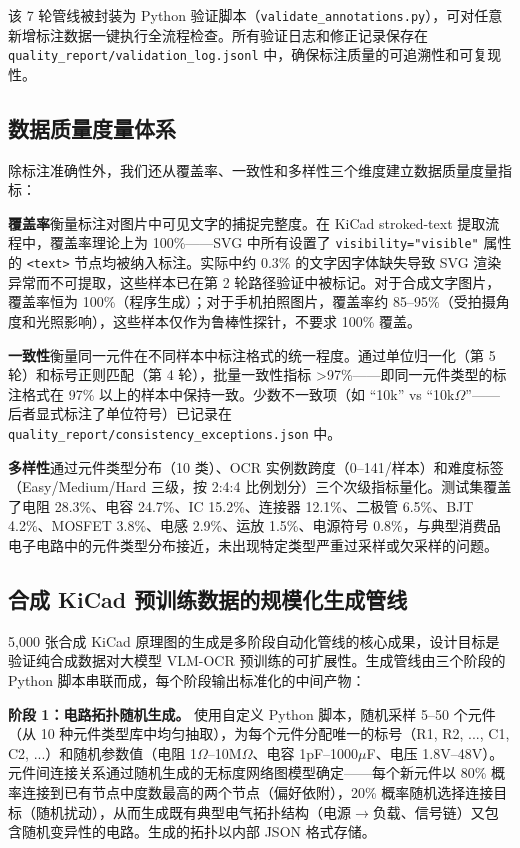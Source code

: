 该 7 轮管线被封装为 Python 验证脚本（\texttt{validate\_annotations.py}），可对任意新增标注数据一键执行全流程检查。所有验证日志和修正记录保存在 \texttt{quality\_report/validation\_log.jsonl} 中，确保标注质量的可追溯性和可复现性。

\subsection{数据质量度量体系}

除标注准确性外，我们还从覆盖率、一致性和多样性三个维度建立数据质量度量指标：

\textbf{覆盖率}衡量标注对图片中可见文字的捕捉完整度。在 KiCad stroked-text 提取流程中，覆盖率理论上为 100\%——SVG 中所有设置了 \texttt{visibility="visible"} 属性的 \texttt{<text>} 节点均被纳入标注。实际中约 0.3\% 的文字因字体缺失导致 SVG 渲染异常而不可提取，这些样本已在第 2 轮路径验证中被标记。对于合成文字图片，覆盖率恒为 100\%（程序生成）；对于手机拍照图片，覆盖率约 85--95\%（受拍摄角度和光照影响），这些样本仅作为鲁棒性探针，不要求 100\% 覆盖。

\textbf{一致性}衡量同一元件在不同样本中标注格式的统一程度。通过单位归一化（第 5 轮）和标号正则匹配（第 4 轮），批量一致性指标 >97\%——即同一元件类型的标注格式在 97\% 以上的样本中保持一致。少数不一致项（如 ``10k'' vs ``10k$\Omega$''——后者显式标注了单位符号）已记录在 \texttt{quality\_report/consistency\_exceptions.json} 中。

\textbf{多样性}通过元件类型分布（10 类）、OCR 实例数跨度（0--141/样本）和难度标签（Easy/Medium/Hard 三级，按 2:4:4 比例划分）三个次级指标量化。测试集覆盖了电阻 28.3\%、电容 24.7\%、IC 15.2\%、连接器 12.1\%、二极管 6.5\%、BJT 4.2\%、MOSFET 3.8\%、电感 2.9\%、运放 1.5\%、电源符号 0.8\%，与典型消费品电子电路中的元件类型分布接近，未出现特定类型严重过采样或欠采样的问题。

\subsection{合成 KiCad 预训练数据的规模化生成管线}

5,000 张合成 KiCad 原理图的生成是多阶段自动化管线的核心成果，设计目标是验证纯合成数据对大模型 VLM-OCR 预训练的可扩展性。生成管线由三个阶段的 Python 脚本串联而成，每个阶段输出标准化的中间产物：

\textbf{阶段 1：电路拓扑随机生成。} 使用自定义 Python 脚本，随机采样 5--50 个元件（从 10 种元件类型库中均匀抽取），为每个元件分配唯一的标号（R1, R2, ..., C1, C2, ...）和随机参数值（电阻 1$\Omega$--10M$\Omega$、电容 1pF--1000$\mu$F、电压 1.8V--48V）。元件间连接关系通过随机生成的无标度网络图模型确定——每个新元件以 80\% 概率连接到已有节点中度数最高的两个节点（偏好依附），20\% 概率随机选择连接目标（随机扰动），从而生成既有典型电气拓扑结构（电源$\to$负载、信号链）又包含随机变异性的电路。生成的拓扑以内部 JSON 格式存储。

